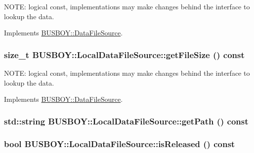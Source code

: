 NOTE: logical const, implementations may make changes behind the interface to lookup the data. 

Implements \hyperlink{classBUSBOY_1_1DataFileSource_ada5ea0b760f3cf5a865197d3fb9e4fcd}{BUSBOY::DataFileSource}.\hypertarget{classBUSBOY_1_1LocalDataFileSource_a2c0ff175265c5460a699910027d3a837}{
\subsubsection[{getFileSize}]{\setlength{\rightskip}{0pt plus 5cm}size\_\-t BUSBOY::LocalDataFileSource::getFileSize () const}}
\label{classBUSBOY_1_1LocalDataFileSource_a2c0ff175265c5460a699910027d3a837}


NOTE: logical const, implementations may make changes behind the interface to lookup the data. 

Implements \hyperlink{classBUSBOY_1_1DataFileSource_a79ad2660b524ee38093b7cc72d2924f5}{BUSBOY::DataFileSource}.\hypertarget{classBUSBOY_1_1LocalDataFileSource_a22b5c087c929d200300ffe914f241c8b}{
\subsubsection[{getPath}]{\setlength{\rightskip}{0pt plus 5cm}std::string BUSBOY::LocalDataFileSource::getPath () const}}
\label{classBUSBOY_1_1LocalDataFileSource_a22b5c087c929d200300ffe914f241c8b}
\hypertarget{classBUSBOY_1_1LocalDataFileSource_aa179b315828ee666797dfb91254ab1e1}{
\subsubsection[{isReleased}]{\setlength{\rightskip}{0pt plus 5cm}bool BUSBOY::LocalDataFileSource::isReleased () const}}
\label{classBUSBOY_1_1LocalDataFileSource_aa179b315828ee666797dfb91254ab1e1}


